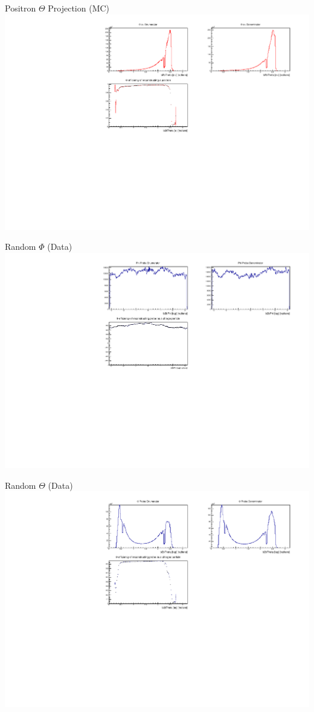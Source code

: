 \documentclass[10pt]{beamer}
\begin{document}
\begin{frame}{Positron $\Theta$ Projection (MC)}
	\centering
	\includegraphics[width=\textwidth]{Plots/Eff/epThetaPro}
\end{frame}

\begin{frame}{Random $\Phi$ (Data)}
	\centering
	\includegraphics[width=\textwidth]{Additional/RandomPhi_Data}
\end{frame}

\begin{frame}{Random $\Theta$ (Data)}
	\centering
	\includegraphics[width=\textwidth]{Additional/RandomTheta_Data}
\end{frame}
\end{document}
